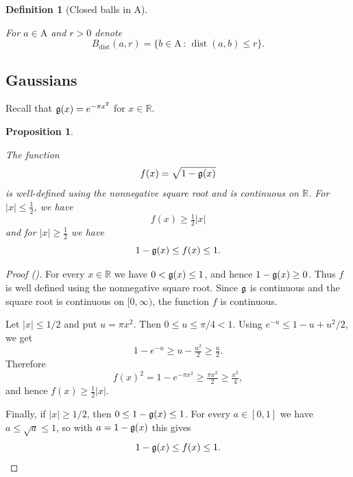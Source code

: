 \documentclass[12pt,reqno]{amsart}
\newcommand{\auto}{{({\tiny\faCar})}}
\theoremstyle{plain}
\newtheorem{proposition}[theorem]{Proposition}
\newtheorem{definition}[theorem]{Definition}
\numberwithin{equation}{section}
\theoremstyle{remark}
\newcommand{\uses}[1]{}
\newcommand{\usesdefs}[1]{}
\newcommand{\leanok}{}
\newcommand{\lean}[1]{}
\newcommand{\R}{{\mathbb R}}
\DeclareMathOperator{\dist}{dist}
\begin{document}
\begin{definition}[Closed balls in $\mathrm{A}$]\label{closed balls in A}\uses{}\usesdefs{multiplicatively spaced monotone sequences,Distance of spaced sequences}
\lean{Auto.sequenceDistanceBall}
For $a\in\mathrm{A}$ and $r>0$ denote
\begin{equation}\label{auto:spaced-sequence-distance-ball}B_{\mathrm{dist}}(a,r)=\{b\in\mathrm{A}\,:\,\dist(a,b)\le r\}.\end{equation}
\end{definition}

\subsection{Gaussians}

Recall that $\mathfrak{g}(x)=e^{-\pi x^2}$ for $x\in\R$.

\begin{proposition}\label{square root one minus Gaussian}\uses{}\usesdefs{gaussian}
\lean{Auto.sqrtOneMinusGaussian,Auto.sqrtOneMinusGaussian_wellDefined,Auto.continuous_sqrtOneMinusGaussian,Auto.sqrtOneMinusGaussian_lower,Auto.sqrtOneMinusGaussian_bounds}
\leanok
    The function
    \begin{equation}\label{auto:square-root-one-minus-Gaussian}
        f(x)=\sqrt{1-\mathfrak{g}(x)}
    \end{equation}
    is well-defined
    using the nonnegative square root and is continuous on $\R$.
    For $|x|\le \frac 12$, we have
    \begin{equation}\label{auto:square-root-one-minus-Gaussian-small-lower-bound}
        f(x)\ge \tfrac 12 |x|
    \end{equation}
    and for $|x|\ge \frac 12$ we have
 \begin{equation}\label{auto:square-root-one-minus-Gaussian-large-bounds}
        1-\mathfrak{g}(x)\le f(x)\le 1.
    \end{equation}
\end{proposition}
\begin{proof}[Proof \auto]
For every $x\in\R$ we have $0<\mathfrak{g}(x)\le 1$, and hence
$1-\mathfrak{g}(x)\ge 0$. Thus $f$ is well defined using the nonnegative square
root. Since $\mathfrak{g}$ is continuous and the square root is continuous on
$[0,\infty)$, the function $f$ is continuous.

Let $|x|\le 1/2$ and put $u=\pi x^2$. Then $0\le u\le \pi/4<1$. Using
$e^{-u}\le 1-u+u^2/2$, we get
\[
1-e^{-u}\ge u-\tfrac{u^2}{2}\ge \tfrac u2 .
\]
Therefore
\[
f(x)^2=1-e^{-\pi x^2}\ge \tfrac{\pi x^2}{2}\ge \tfrac{x^2}{4},
\]
and hence $f(x)\ge \frac12 |x|$.

Finally, if $|x|\ge 1/2$, then $0\le 1-\mathfrak{g}(x)\le 1$. For every
$a\in[0,1]$ we have $a\le \sqrt a\le 1$, so with $a=1-\mathfrak{g}(x)$ this gives
\[
1-\mathfrak{g}(x)\le f(x)\le 1 .
\]
\end{proof}
\end{document}
